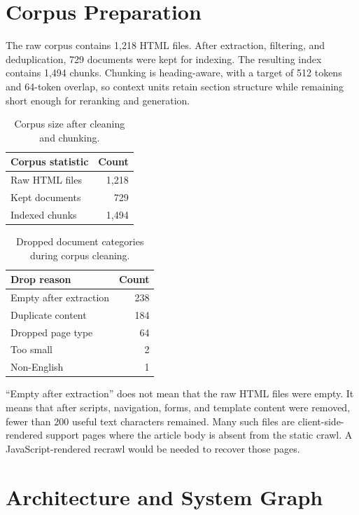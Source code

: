 \documentclass[11pt]{article}
\begin{document}
\section{Corpus Preparation}

The raw corpus contains 1,218 HTML files. After extraction, filtering, and deduplication,
729 documents were kept for indexing. The resulting index contains 1,494 chunks. Chunking
is heading-aware, with a target of 512 tokens and 64-token overlap, so context units retain
section structure while remaining short enough for reranking and generation.

\begin{table}[h]
\centering
\begin{tabular}{lr}
\toprule
Corpus statistic & Count \\
\midrule
Raw HTML files & 1,218 \\
Kept documents & 729 \\
Indexed chunks & 1,494 \\
\bottomrule
\end{tabular}
\caption{Corpus size after cleaning and chunking.}
\end{table}

\begin{table}[h]
\centering
\begin{tabular}{lr}
\toprule
Drop reason & Count \\
\midrule
Empty after extraction & 238 \\
Duplicate content & 184 \\
Dropped page type & 64 \\
Too small & 2 \\
Non-English & 1 \\
\bottomrule
\end{tabular}
\caption{Dropped document categories during corpus cleaning.}
\end{table}

``Empty after extraction'' does not mean that the raw HTML files were empty. It means that
after scripts, navigation, forms, and template content were removed, fewer than 200 useful
text characters remained. Many such files are client-side-rendered support pages where the
article body is absent from the static crawl. A JavaScript-rendered recrawl would be needed
to recover those pages.

\section{Architecture and System Graph}
\end{document}
